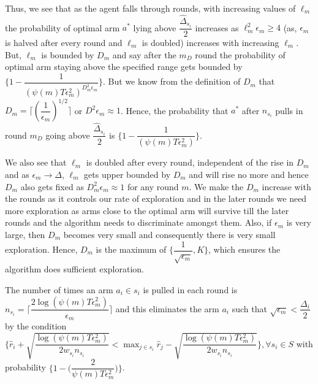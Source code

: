 \begin{remark}
	Thus, we see that as the agent falls through rounds, with increasing values of $\ell_{m}$ the probability of optimal arm $a^{*}$ lying above $\dfrac{\hat{\Delta}_{s_{i}}}{2}$ increases as $\ell_{m}^{2}\epsilon_{m}\geq 4$ (as, $\epsilon_{m}$ is halved after every round and $\ell_{m}$ is doubled) increases with increasing $\ell_{m}$. But, $\ell_{m}$ is bounded by $D_{m}$ and say after the $m_{D}$ round the probability of optimal arm staying above the specified range gets bounded by $\bigg\lbrace 1- \dfrac{1}{(\psi(m)T\epsilon_{m}^{2})^{D_{m}^{2}\epsilon_{m}}} \bigg\rbrace$. But we know from the definition of $D_{m}$ that $ D_{m}=\bigg\lceil(\dfrac{1}{\epsilon_{m}})^{1/2}\bigg\rceil$ or $D^{2}\epsilon_{m}\approx 1$. Hence, the probability that   $a^{*}$ after $n_{s_{i}}$ pulls in round $m_{D}$ going above $\dfrac{\hat{\Delta}_{s_{i}}}{2}$ is $\bigg\lbrace 1- \dfrac{1}{(\psi(m)T\epsilon_{m}^{2}) }\bigg\rbrace$.

	We also see that $\ell_{m}$ is doubled after every round, independent of the rise in $D_{m}$ and as $\epsilon_{m}\rightarrow \Delta $, $\ell_{m}$ gets upper bounded by $D_{m}$ and will rise no more and hence $D_{m}$ also gets fixed as $D_{m}^{2}\epsilon_{m}\approx 1$ for any round $m$. We make the $D_{m}$ increase with the rounds as it controls our rate of exploration and in the later rounds we need more exploration as arms close to the optimal arm will survive till the later rounds and the algorithm needs to discriminate amongst them.  Also, if $\epsilon_{m}$ is very large, then $D_{m}$ becomes very small and consequently there is very small exploration. Hence, $D_{m}$ is the maximum of $\lbrace \dfrac{1}{\sqrt{\epsilon_{m}}}, K \rbrace$, which ensures the algorithm does sufficient exploration. 
\end{remark}



\begin{proposition}
The number of times an arm $a_{i}\in s_{i}$ is pulled in each round is $n_{s_{i}}=\bigg\lceil\dfrac{2\log{(\psi(m)T\epsilon_{m}^{2})}}{\epsilon_{m}}\bigg\rceil$ and this eliminates the arm $a_{i}$ such that $\sqrt{\epsilon_{m}}<\dfrac{\Delta_{i}}{2}$ by the condition $\bigg\lbrace\hat{r}_{i} + \sqrt{\dfrac{\log (\psi(m)T\epsilon_{m}^{2})}{2w_{s_{i}} n_{s_{i}}}} < \max_{j\in s_{i}}\hat{r}_{j} - \sqrt{\dfrac{\log (\psi(m)T\epsilon_{m}^{2})}{2w_{s_{i}} n_{s_{i}}}} \bigg\rbrace, \forall s_{i}\in S$ with probability $\bigg\lbrace 1-\bigg(\dfrac{2}{\psi(m)T\epsilon_{m}^{2}}\bigg)\bigg\rbrace$. 
\end{proposition}

